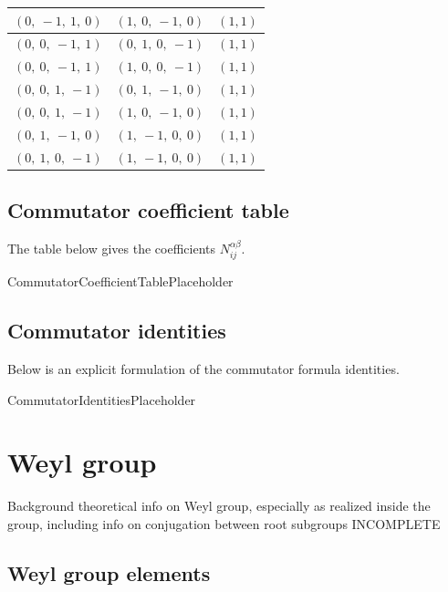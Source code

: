 \documentclass[11pt]{article}
\newcommand{\noi}{\noindent}
\theoremstyle{definition}
\begin{document}
\begin{tabular}{|l|l|c|}
    \hline
    $\left( 0, \  -1, \  1, \  0\right)$ & $\left( 1, \  0, \  -1, \  0\right)$ & $(1,1)$ \\
    \hline
    $\left( 0, \  0, \  -1, \  1\right)$ & $\left( 0, \  1, \  0, \  -1\right)$ & $(1,1)$ \\
    \hline
    $\left( 0, \  0, \  -1, \  1\right)$ & $\left( 1, \  0, \  0, \  -1\right)$ & $(1,1)$ \\
    \hline
    $\left( 0, \  0, \  1, \  -1\right)$ & $\left( 0, \  1, \  -1, \  0\right)$ & $(1,1)$ \\
    \hline
    $\left( 0, \  0, \  1, \  -1\right)$ & $\left( 1, \  0, \  -1, \  0\right)$ & $(1,1)$ \\
    \hline
    $\left( 0, \  1, \  -1, \  0\right)$ & $\left( 1, \  -1, \  0, \  0\right)$ & $(1,1)$ \\
    \hline
    $\left( 0, \  1, \  0, \  -1\right)$ & $\left( 1, \  -1, \  0, \  0\right)$ & $(1,1)$ \\
    \hline
\end{tabular}


\subsection{Commutator coefficient table}

\noi The table below gives the coefficients $N_{ij}^{\alpha\beta}$.

CommutatorCoefficientTablePlaceholder

\subsection{Commutator identities}

\noi Below is an explicit formulation of the commutator formula identities.

CommutatorIdentitiesPlaceholder

\newpage
\section{Weyl group}

\noi Background theoretical info on Weyl group, especially as realized inside the group, including info on conjugation between root subgroups INCOMPLETE

\subsection{Weyl group elements}
\end{document}
